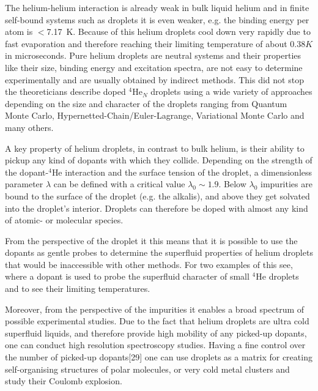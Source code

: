 		The helium-helium interaction is already weak in bulk liquid helium and in finite self-bound systems such as droplets it is even weaker, e.g. the binding energy per atom is $<$7.17~K. Because of this helium droplets cool down very rapidly due to fast evaporation and therefore reaching their limiting temperature of about $0.38\unit{K}$ in microseconds. Pure helium droplets are neutral systems and their properties like their size, binding energy and excitation spectra, are not easy to determine experimentally and are usually obtained by indirect methods. This did not stop the theoreticians describe doped $^4$He$_N$ droplets using a wide variety of approaches depending on the size and character of the droplets ranging from Quantum Monte Carlo, Hypernetted-Chain/Euler-Lagrange\citep{Krotscheck2001}, Variational Monte Carlo\citep{Gartner2018} and many others.
		
		A key property of helium droplets, in contrast to bulk helium, is their ability to pickup any kind of dopants with which they collide. Depending on the strength of the dopant-$^4$He interaction and the surface tension of the droplet, a dimensionless parameter $\lambda$ can be defined\citep{Anc95} with a critical value $\lambda_0\sim1.9$. Below $\lambda_0$ impurities are bound to the surface of the droplet (e.g. the alkalis), and above they get solvated into the droplet's interior. Droplets can therefore be doped with almost any kind of atomic- or molecular species. 
		
		From the perspective of the droplet it this means that it is possible to use the dopants as gentle probes to determine the superfluid properties of helium droplets that would be inaccessible with other methods. For two examples of this see, where a dopant is used to probe the superfluid character of small $^4$He droplets and to see their limiting temperatures.
		
		Moreover, from the perspective of the impurities it enables a broad spectrum of possible experimental studies. Due to the fact that helium droplets are ultra cold superfluid liquids, and therefore provide high mobility of any picked-up dopants, one can conduct high resolution spectroscopy studies. Having a fine control over the number of picked-up dopants[29] one can use droplets as a matrix for creating self-organising structures of polar molecules, or very cold metal clusters and study their Coulomb explosion.
				
